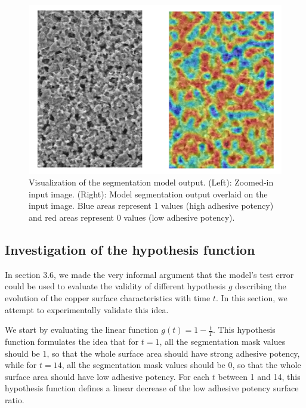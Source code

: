 \documentclass[10pt,twocolumn,letterpaper]{article}
\begin{document}
\begin{figure}[h]
\centering
\includegraphics[width=0.9\linewidth]{"./figures/Figure9"}
\caption{
Visualization of the segmentation model output.
(Left): Zoomed-in input image.
(Right): Model segmentation output overlaid on the input image.
Blue areas represent 1 values (high adhesive potency) 
and red areas represent 0 values (low adhesive potency).
}
\end{figure}

\subsection{Investigation of the hypothesis function}
In section 3.6, we made the very informal argument that the model's test error could be used
to evaluate the validity of different hypothesis $g$ describing the evolution of
the copper surface characteristics with time $t$. 
In this section, we attempt to experimentally validate this idea.

We start by evaluating the linear function $g(t)=1 - \frac{t}{T}$.
This hypothesis function formulates the idea that for $t=1$, 
all the  segmentation mask values should be $1$, 
so that the whole surface area should have strong adhesive potency, 
while for $t=14$, all the segmentation mask values should be $0$, so that 
the whole surface area should have low adhesive potency.
For each $t$ between 1 and 14, this hypothesis function defines a linear decrease
of the low adhesive potency surface ratio.
\end{document}

